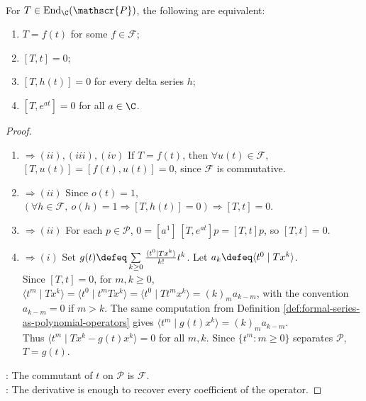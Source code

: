 \begin{theorem} \label{thm:formal-series-operators-commutant-characterization} \\
For $T\in\operatorname{End}_{\C}(\mathscr{P})$, the following are equivalent:
\begin{enumerate}[label=(\roman*)]
\setlength{\itemsep}{0pt}
\item $T=f(t)$ for some $f\in\mathscr{F}$;
\item $[T,t]=0$;
\item $[T,h(t)]=0$ for every delta series $h$;
\item $[T,e^{at}]=0$ for all $a\in\C$.
\end{enumerate}
\begin{proof}
\begin{enumerate}[label=(\roman*).]
\setlength{\itemsep}{0pt}
\item[$(i)$]$\Rightarrow (ii),(iii),(iv)$ If $T=f(t)$, then $\forall u(t)\in\mathscr{F}$, $[T,u(t)]=[f(t),u(t)]=0$, since $\mathscr{F}$ is commutative.
\item[$(iii)$]$\Rightarrow (ii)$ Since $o(t)=1$, $(\forall h\in\mathscr{F},\ o(h)=1\Rightarrow [T,h(t)]=0) \Rightarrow [T,t]=0$.
\item[$(iv)$]$\Rightarrow (ii)$ For each $p\in\mathscr{P}$, $0=[a^1]\,[T,e^{at}]p=[T,t]p$, so $[T,t]=0$.
\item[$(ii)$]$\Rightarrow (i)$ Set $g(t)\defeq\sum\limits_{k\geq0}\frac{\langle t^0\mid Tx^k\rangle}{k!}t^k$. Let $a_k\defeq\langle t^0\mid Tx^k\rangle$.\\
Since $[T,t]=0$, for $m,k\geq0$, $\langle t^m\mid Tx^k\rangle =\langle t^0\mid t^mTx^k\rangle =\langle t^0\mid Tt^mx^k\rangle =(k)_m a_{k-m}$, with the convention $a_{k-m}=0$ if $m>k$. The same computation from Definition \ref{def:formal-series-as-polynomial-operators} gives $\langle t^m\mid g(t)x^k\rangle=(k)_m a_{k-m}$.\\
Thus $\langle t^m\mid Tx^k-g(t)x^k\rangle=0$ for all $m,k$. Since $\{t^m:m\geq0\}$ separates $\mathscr{P}$, $T=g(t)$.
\end{enumerate}
: The commutant of $t$ on $\mathscr{P}$ is $\mathscr{F}$.\\
: The derivative is enough to recover every coefficient of the operator.
\end{proof}
\end{theorem}

